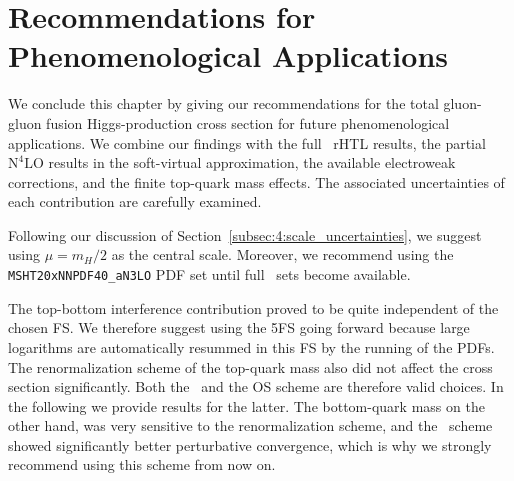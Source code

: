 \section{Recommendations for Phenomenological Applications} \label{sec:6:recommendations}
We conclude this chapter by giving our recommendations for the total gluon-gluon fusion Higgs-production cross section for future phenomenological applications. We combine our findings with the full \NNNLO\ \acs{rHTL} results, the partial $\mathrm{N}^4\mathrm{LO}$ results in the soft-virtual approximation, the available electroweak corrections, and the finite top-quark mass effects. The associated uncertainties of each contribution are carefully examined.

Following our discussion of Section~\ref{subsec:4:scale_uncertainties}, we suggest using $\mu = m_H/2$ as the central scale. Moreover, we recommend using the \texttt{MSHT20xNNPDF40\_aN3LO} \acs{PDF} set until full \NNNLO\ sets become available.

The top-bottom interference contribution proved to be quite independent of the chosen \acs{FS}. We therefore suggest using the 5\acs{FS} going forward because large logarithms are automatically resummed in this \acs{FS} by the running of the \acs{PDF}s. The renormalization scheme of the top-quark mass also did not affect the cross section significantly. Both the \MS\ and the \acs{OS} scheme are therefore valid choices. In the following we provide results for the latter. The bottom-quark mass on the other hand, was very sensitive to the renormalization scheme, and the \MS\ scheme showed significantly better perturbative convergence, which is why we strongly recommend using this scheme from now on.

